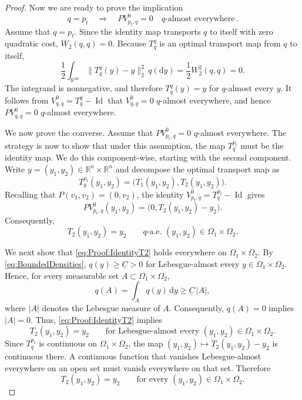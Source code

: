 \documentclass[oneside,11pt]{article}
\theoremstyle{remark}
\newcommand{\R}{\mathbb{R}}
\begin{document}
\begin{proof}
Now we are ready to prove the implication
\[
    q=p_t
    \quad\Longrightarrow\quad
    PV_{p_t,q}^0=0
    \quad q\text{-almost everywhere}\,.
\]
Assume that $q=p_t$. Since the identity map transports $q$ to itself
with zero quadratic cost, $W_2(q,q)=0$. Because $T_q^q$ is an optimal
transport map from $q$ to itself,
\[
    \frac12
    \int_{\R^{2n}}
        \|T_q^q(y)-y\|_2^2
        \,q(\mathrm dy)
    =
    \frac12W_2^2(q,q)
    =
    0.
\]
The integrand is nonnegative, and therefore
$T_q^q(y)=y$ for $q$-almost every $y$. It follows from
$V_{q,q}^0=T_q^q-\operatorname{Id}$ that
$V_{q,q}^0=0$ $q$-almost everywhere, and hence
$PV_{q,q}^0=0$ $q$-almost everywhere.

We now prove the converse. Assume that
$PV_{p_t,q}^0=0$ $q$-almost everywhere. The strategy is now to show that under this assumption, the map $T_q^{p_t}$ must be the identity map. We do this component-wise, starting with the second component. Write
$y=(y_1,y_2)\in\R^n\times\R^n$ and decompose the optimal transport map
as
\[
    T_q^{p_t}(y_1,y_2)
    =
    \bigl(
        T_1(y_1,y_2),
        T_2(y_1,y_2)
    \bigr).
\]
Recalling that $P(v_1,v_2)=(0,v_2)$, the identity
$V_{p_t,q}^0=T_q^{p_t}-\operatorname{Id}$ gives
\[
    PV_{p_t,q}^0(y_1,y_2)
    =
    \bigl(
        0,
        T_2(y_1,y_2)-y_2
    \bigr).
\]
Consequently,
\begin{equation}\label{eq:Proof:IdentityT2}
    T_2(y_1,y_2)=y_2
    \qquad
    q\text{-a.e. }(y_1,y_2) \in \Omega_1 \times \Omega_2.
\end{equation}

We next show that \eqref{eq:Proof:IdentityT2} holds everywhere on
$\Omega_1\times\Omega_2$. By \eqref{eq:BoundedDensities},
$q(y)\geq \underline{C} >0$ for Lebesgue-almost every $y \in \Omega_1\times\Omega_2$. Hence, for every measurable
set $A\subset\Omega_1\times\Omega_2$,
\[
    q(A)
    =
    \int_A q(y)\,\mathrm dy
    \geq
    \underline{C}\,|A|,
\]
where $|A|$ denotes the Lebesgue measure of $A$. Consequently,
$q(A)=0$ implies $|A|=0$. Thus, \eqref{eq:Proof:IdentityT2} implies
\[
    T_2(y_1,y_2)=y_2
    \qquad
    \text{for Lebesgue-almost every }(y_1,y_2)
    \in\Omega_1\times\Omega_2.
\]
Since $T_q^{p_t}$ is continuous on $\Omega_1\times\Omega_2$, the map
$(y_1,y_2)\mapsto T_2(y_1,y_2)-y_2$ is continuous there. A continuous
function that vanishes Lebesgue-almost everywhere on an open set must
vanish everywhere on that set. Therefore
\begin{equation}\label{eq:Proof:T2IsIdentity}
    T_2(y_1,y_2)=y_2
    \qquad
    \text{for every }(y_1,y_2)\in\Omega_1\times\Omega_2.
\end{equation}




\end{proof}
\end{document}
